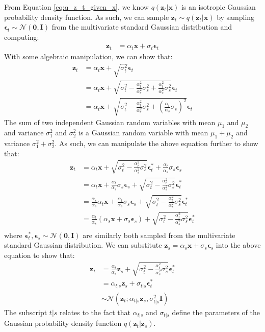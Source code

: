 \documentclass[ oneside,%
                    author={George Herbert},
                    degree={MSci},
                     title={Video Diffusion Models for Climate Simulations},
                  subtitle={}]{dissertation}
\begin{document}
From Equation \ref{eq:q_z_t_given_x}, we know $q(\mathbf{z}_t|\mathbf{x})$ is an isotropic Gaussian probability density function. As such, we can sample $\mathbf{z}_t\sim q(\mathbf{z}_t|\mathbf{x})$ by sampling $\boldsymbol\epsilon_t\sim\mathcal{N}(\mathbf{0}, \mathbf{I})$ from the multivariate standard Gaussian distribution and computing:
\begin{align}
      \mathbf{z}_t&=\alpha_t\mathbf{x}+\sigma_t\boldsymbol\epsilon_t
\end{align}
With some algebraic manipulation, we can show that:
\begin{align}
      \mathbf{z}_t&=\alpha_t\mathbf{x}+\sqrt{\sigma_t^2}\boldsymbol\epsilon_t\\
      &=\alpha_t\mathbf{x}+\sqrt{\sigma_t^2-\frac{\alpha_t^2}{\alpha_s^2}\sigma_s^2+\frac{\alpha_t^2}{\alpha_s^2}\sigma_s^2}\boldsymbol\epsilon_t\\
      &=\alpha_t\mathbf{x}+\sqrt{\sigma_t^2-\frac{\alpha_t^2}{\alpha_s^2}\sigma_s^2+\left(\frac{\alpha_t}{\alpha_s}\sigma_s\right)^2}\boldsymbol\epsilon_t
\end{align}
The sum of two independent Gaussian random variables with mean $\mu_1$ and $\mu_2$ and variance $\sigma_1^2$ and $\sigma_2^2$ is a Gaussian random variable with mean $\mu_1+\mu_2$ and variance $\sigma_1^2+\sigma_2^2$. As such, we can manipulate the above equation further to show that:
\begin{align}
      \mathbf{z}_t&=\alpha_t\mathbf{x}+\sqrt{\sigma_t^2-\frac{\alpha_t^2}{\alpha_s^2}\sigma_s^2}\boldsymbol\epsilon_t^*+\frac{\alpha_t}{\alpha_s}\sigma_s\boldsymbol\epsilon_s\\
      &=\alpha_t\mathbf{x}+\frac{\alpha_t}{\alpha_s}\sigma_s\boldsymbol\epsilon_s+\sqrt{\sigma_t^2-\frac{\alpha_t^2}{\alpha_s^2}\sigma_s^2}\boldsymbol\epsilon_t^*\\
      &=\frac{\alpha_s}{\alpha_s}\alpha_t\mathbf{x}+\frac{\alpha_t}{\alpha_s}\sigma_s\boldsymbol\epsilon_s+\sqrt{\sigma_t^2-\frac{\alpha_t^2}{\alpha_s^2}\sigma_s^2}\boldsymbol\epsilon_t^*\\
      &=\frac{\alpha_t}{\alpha_s}(\alpha_s\mathbf{x}+\sigma_s\boldsymbol\epsilon_s)+\sqrt{\sigma_t^2-\frac{\alpha_t^2}{\alpha_s^2}\sigma_s^2}\boldsymbol\epsilon_t^*\\
\end{align}
where $\boldsymbol\epsilon_t^*, \boldsymbol\epsilon_s\sim\mathcal{N}(\mathbf{0}, \mathbf{I})$ are similarly both sampled from the multivariate standard Gaussian distribution. We can substitute $\mathbf{z}_s=\alpha_s\mathbf{x}+\sigma_s\boldsymbol\epsilon_s$ into the above equation to show that:
\begin{align}
      \mathbf{z}_t&=\frac{\alpha_t}{\alpha_s}\mathbf{z}_s+\sqrt{\sigma_t^2-\frac{\alpha_t^2}{\alpha_s^2}\sigma_s^2}\boldsymbol\epsilon_t^*\\
      &=\alpha_{t|s}\mathbf{z}_s+\sigma_{t|s}\boldsymbol\epsilon_t^*\\
      &\sim\mathcal{N}\left(\mathbf{z}_t;\alpha_{t|s}\mathbf{z}_s,\sigma_{t|s}^2\mathbf{I}\right)
\end{align}
The subscript $t|s$ relates to the fact that $\alpha_{t|s}$ and $\sigma_{t|s}$ define the parameters of the Gaussian probability density function $q(\mathbf{z}_t|\mathbf{z}_s)$.
\end{document}
